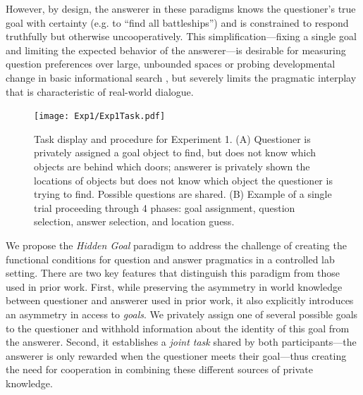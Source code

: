 \documentclass[11pt, floatsintext]{apa6}
\begin{document}
However, by design, the answerer in these paradigms knows the questioner's true goal with certainty (e.g. to ``find all battleships'') and is constrained to respond truthfully but otherwise uncooperatively.
This simplification---fixing a single goal and limiting the expected behavior of the answerer---is desirable for measuring question preferences over large, unbounded spaces \cite{cohen2016searching, rothe2017question} or probing developmental change in basic informational search \cite{RuggeriEtAl15_HierarchicalTwentyQs, ruggeri2016sources}, but severely limits the pragmatic interplay that is characteristic of real-world dialogue. 

\begin{figure}[t!]
\begin{center}
\texttt{[image: Exp1/Exp1Task.pdf]}
\end{center}
\caption{\footnotesize Task display and procedure for Experiment 1. (A) Questioner is privately assigned a goal object to find, but does not know which objects are behind which doors; answerer is privately shown the locations of objects but does not know which object the questioner is trying to find. Possible questions are shared. (B) Example of a single trial proceeding through 4 phases: goal assignment, question selection, answer selection, and location guess.}
\label{fig:expviews}
\end{figure}


We propose the \emph{Hidden Goal} paradigm to address the challenge of creating the functional conditions for question and answer pragmatics in a controlled lab setting.
There are two key features that distinguish this paradigm from those used in prior work.
First, while preserving the asymmetry in world knowledge between questioner and answerer used in prior work, it also explicitly introduces an asymmetry in access to \emph{goals}.
We privately assign one of several possible goals to the questioner and withhold information about the identity of this goal from the answerer. 
Second, it establishes a \emph{joint task} shared by both participants---the answerer is only rewarded when the questioner meets their goal---thus creating the need for cooperation in combining these different sources of private knowledge. 

\end{document}
